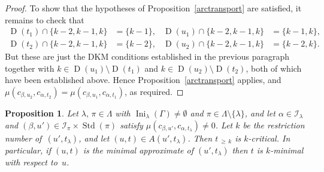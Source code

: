 \documentclass[10pt]{amsart}
\newtheorem{prop}[theo]{Proposition}
\theoremstyle{definition}
\DeclareMathOperator{\Ini}{Ini}
\newcommand{\Morethan}[2]{#1\,{_{\geqslant\,#2}}}
\DeclareMathOperator{\STD}{Std}
\DeclareMathOperator{\D}{D}
\begin{document}
\begin{proof}
To show that the hypotheses of Proposition~\ref{arctransport} are satisfied, it
remains to check that
\begin{align*}
\D(t_1)\cap \{k-2,k-1,k\} &= \{k-1\},&\D(u_1)\cap \{k-2,k-1,k\} &= \{k-1,k\},\\
\D(t_2)\cap \{k-2,k-1,k\} &= \{k-2\},&\D(u_2)\cap \{k-2,k-1,k\} &= \{k-2,k\}.
\end{align*}
But these are just the DKM conditions established in the previous paragraph together
with $k\in \D(u_1)\setminus\D(t_1)$ and $k\in \D(u_2)\setminus\D(t_2)$, both
of which have been established above. Hence Proposition~\ref{arctransport} applies,
and $\mu(c_{\beta,u_2},c_{\alpha,t_2})=\mu(c_{\beta,u_1},c_{\alpha,t_1})$, as required.
\end{proof}

\begin{prop}\label{cellorder}
Let $\lambda,\,\pi\in\Lambda$ with $\Ini_\lambda(\Gamma)\ne\emptyset$ and
$\pi\in\Lambda\setminus\{\lambda\}$, and let $\alpha\in\mathcal I_\lambda$
and $(\beta,u')\in\mathcal I_\pi\times\STD(\pi)$ satisfy
$\mu(c_{\beta,u'},c_{\alpha,t_\lambda})\neq 0$.
Let $k$ be the restriction number of~$(u',t_\lambda)$, and let $(u,t)\in A(u',t_\lambda)$.
Then $\Morethan tk$ is $k$-critical. In particular, if $(u,t)$ is
the minimal approximate of $(u',t_\lambda)$ then $t$ is $k$-minimal
with respect to~$u$.
\end{prop}
\end{document}
